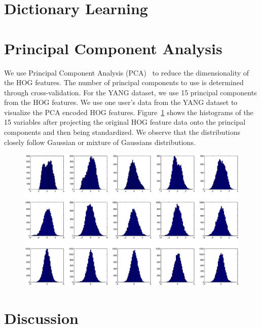 \section{Dictionary Learning}

\section{Principal Component Analysis}
We use Principal Component Analysis (PCA)~\cite{pca} to reduce the
dimensionality of the HOG features. The number of principal components to use
is determined through cross-validation. For the YANG dataset, we use 15
principal components from the HOG features. We use one
user's data from the YANG dataset to visualize the PCA
encoded HOG features. Figure~\ref{fig:pca} shows the histograms of the 15
variables after projecting the original HOG feature data onto the principal
components and then being standardized.
We observe that the distributions closely follow Gaussian or mixture of
Gaussians distributions.

\begin{figure}[tbh]
\includegraphics[width=\columnwidth]{figures/hist_pca.eps}
\caption{}
\label{fig:pca}
\end{figure}

\section{Discussion}